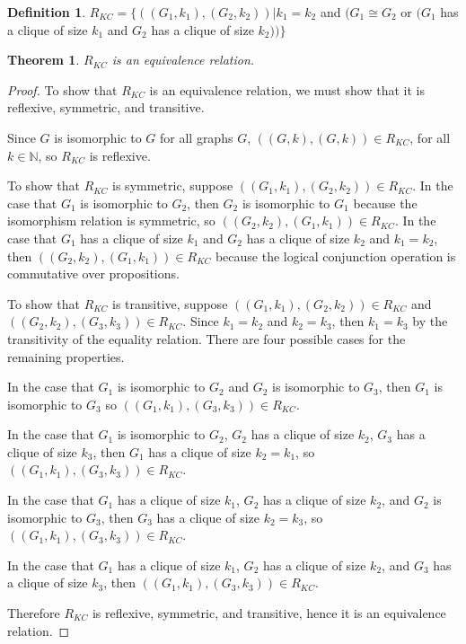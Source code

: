 \documentclass{article}
\newtheorem{theorem}{Theorem}[section]
\theoremstyle{definition} \newtheorem{definition}[definition]{Definition}
\begin{document}
\begin{definition}
  $R_{KC}=\{((G_1, k_1), (G_2, k_2))| k_1=k_2$ and $(G_1\cong G_2$ or $(G_1$
  has a clique of size $k_1$ and $G_2$ has a clique of size $k_2))\}$
\end{definition}

\begin{theorem}$R_{KC}$ is an equivalence relation.\end{theorem}
\begin{proof}To show that $R_{KC}$ is an equivalence relation, we must show
  that it is reflexive, symmetric, and transitive.

  Since $G$ is isomorphic to $G$ for all graphs $G$, $((G,k),(G,k))\in R_{KC}$,
  for all $k\in\mathbb{N}$, so $R_{KC}$ is reflexive.

  To show that $R_{KC}$ is symmetric, suppose $((G_1, k_1), (G_2, k_2))\in
  R_{KC}$. In the case that $G_1$ is isomorphic to $G_2$, then $G_2$ is
  isomorphic to $G_1$ because the isomorphism relation is symmetric, so
  $((G_2,k_2),(G_1,k_1))\in R_{KC}$. In the case that $G_1$ has a clique of
  size $k_1$ and $G_2$ has a clique of size $k_2$ and $k_1=k_2$, then
  $((G_2,k_2),(G_1,k_1))\in R_{KC}$ because the logical conjunction operation
  is commutative over propositions.

  To show that $R_{KC}$ is transitive, suppose $((G_1, k_1), (G_2, k_2))\in
  R_{KC}$ and $((G_2, k_2), (G_3, k_3))\in R_{KC}$. Since $k_1=k_2$ and
  $k_2=k_3$, then $k_1=k_3$ by the transitivity of the equality relation. There
  are four possible cases for the remaining properties.

  In the case that $G_1$ is isomorphic to $G_2$ and $G_2$ is isomorphic to
  $G_3$, then $G_1$ is isomorphic to $G_3$ so $((G_1, k_1), (G_3, k_3))\in
  R_{KC}$.

  In the case that $G_1$ is isomorphic to $G_2$, $G_2$ has a clique of size
  $k_2$, $G_3$ has a clique of size $k_3$, then $G_1$ has a clique of size
  $k_2=k_1$, so $((G_1, k_1), (G_3, k_3))\in R_{KC}$.

  In the case that $G_1$ has a clique of size $k_1$, $G_2$ has a clique of size
  $k_2$, and $G_2$ is isomorphic to $G_3$, then $G_3$ has a clique
  of size $k_2=k_3$, so $((G_1, k_1), (G_3, k_3))\in R_{KC}$.

  In the case that $G_1$ has a clique of size $k_1$, $G_2$ has a clique of size
  $k_2$, and $G_3$ has a clique of size $k_3$, then $((G_1, k_1), (G_3,
  k_3))\in R_{KC}$.

  Therefore $R_{KC}$ is reflexive, symmetric, and transitive, hence it is an
  equivalence relation.
\end{proof}
\end{document}
